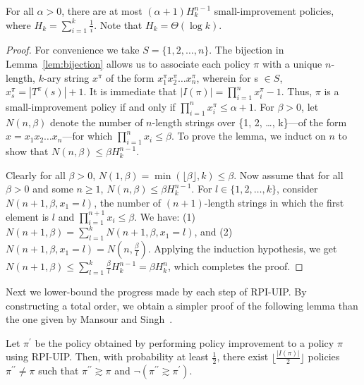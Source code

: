 \begin{lemma}
\label{lem:countsmall}
    For all $\alpha > 0$, there are at most $(\alpha + 1)H_{k}^{n-1}$ small-improvement policies, where $H_k = \sum_{i=1}^{k} \frac{1}{i}$. Note that $H_{k} = \Theta(\log k)$.
\end{lemma}
\begin{proof}
    For convenience we take $S = \{1, 2, \dots, n\}$. The bijection in  Lemma~\ref{lem:bijection} allows us to associate each policy $\pi$ with a unique $n$-length, $k$-ary string $x^{\pi}$ of the form $x^{\pi}_{1}x^{\pi}_{2}\dots{x^{\pi}_{n}}$, wherein for s $\in S$, $x^{\pi}_{s} = |T^{\pi}(s)| + 1$. It is immediate that $|I(\pi)| = \prod_{i = 1}^{n} x^{\pi}_{i} - 1$. Thus, $\pi$ is a small-improvement policy if and only if
    $\prod_{i = 1}^{n} x^{\pi}_{i} \leq \alpha + 1.$ For $\beta > 0$, let $N(n, \beta)$ denote the number of $n$-length strings over \{1, 2, \dots, k\}---of the form $x = x_{1}x_{2}\dots{x_{n}}$---for which $\prod_{i = 1}^{n} x_{i} \leq \beta.$ To prove the lemma, we induct on $n$ to show that $N(n, \beta) \leq \beta H_{k}^{n - 1}$.
  
    Clearly for all $\beta > 0$, $N(1, \beta) = \min(\lfloor\beta\rfloor, k) \leq \beta$.
Now assume that for all $\beta > 0$ and some $n \geq 1$, $N(n, \beta) \leq \beta H_k^{n - 1}$. For $l \in \{1, 2, \dots, k\}$, consider $N(n + 1, \beta, x_{1} = l)$, the number of $(n + 1)$-length strings in which the first element is $l$ and $\prod_{i = 1}^{n + 1} x_{i} \leq \beta.$ We have: (1) 
$N(n + 1,\beta) = \sum_{l = 1}^{k} N(n + 1, \beta, x_{1} = l)$, and (2) $N(n + 1, \beta, x_{1} = l) = N(n, \frac{\beta}{l})$. Applying the induction hypothesis, we get $N(n + 1,\beta) \leq \sum_{l = 1}^{k} \frac{\beta}{l} H_{k}^{n - 1} = \beta H_{k}^{n}$, which completes the proof.
\end{proof}
Next we lower-bound the progress made by each step of RPI-UIP. By  constructing a total order, we obtain a simpler proof of the following lemma than the one given by
Mansour and Singh~.
\begin{lemma}
\label{lem:largeimp}
Let $\pi^{\prime}$ be the policy obtained by performing policy improvement to a policy $\pi$ using RPI-UIP. Then, with probability at least $\frac{1}{2}$, there exist $\lfloor \frac{|I(\pi)|}{2} \rfloor$ policies $\pi^{\prime\prime} \neq \pi$ such that $\pi^{\prime\prime} \gtrsim \pi$ and $\neg(\pi^{\prime\prime} \gtrsim \pi^{\prime})$.
\end{lemma}
